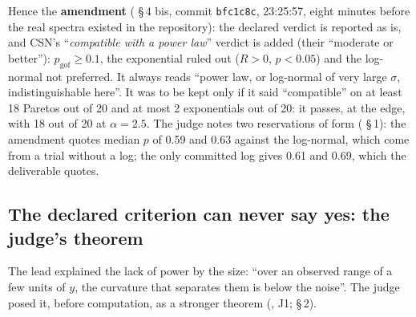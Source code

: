 Hence the \textbf{amendment} ( §\,4 bis, commit \texttt{bfc1c8c}, 23:25:57, eight minutes before the real spectra existed in the repository): the declared verdict is reported as is, and CSN's ``\emph{compatible with a power law}'' verdict is added (their ``moderate or better''): $p_{\mathrm{gof}} \ge 0.1$, the exponential ruled out ($R > 0$, $p < 0.05$) and the log-normal not preferred. It always reads ``power law, or log-normal of very large $\sigma$, indistinguishable here''. It was to be kept only if it said ``compatible'' on at least 18 Paretos out of 20 and at most 2 exponentials out of 20: it passes, at the edge, with 18 out of 20 at $\alpha = 2.5$. The judge notes two reservations of form ( §\,1): the amendment quotes median $p$ of 0.59 and 0.63 against the log-normal, which come from a trial without a log; the only committed log gives 0.61 and 0.69, which the deliverable quotes.

\subsection{The declared criterion can never say yes: the judge's theorem}\label{t3spe:sec:theoreme}

The lead explained the lack of power by the size: ``over an observed range of a few units of $y$, the curvature that separates them is below the noise''. The judge posed it, before computation, as a stronger theorem (, J1;  §\,2).

